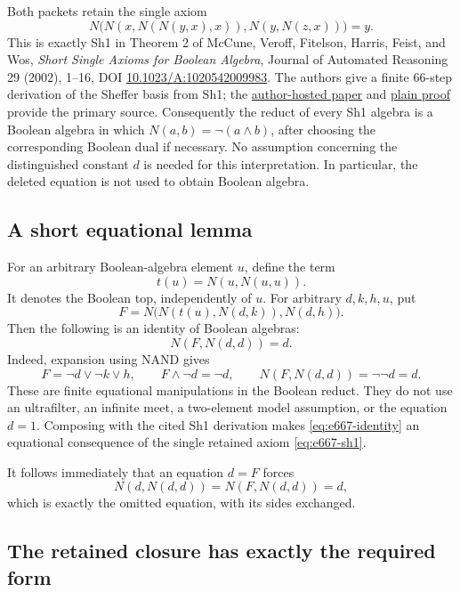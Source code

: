 Both packets retain the single axiom
\begin{equation}
 N\bigl(N(x,N(N(y,x),x)),N(y,N(z,x))\bigr)=y.
\label{eq:e667-sh1}
\end{equation}
This is exactly Sh1 in Theorem 2 of McCune, Veroff, Fitelson, Harris, Feist,
and Wos, \emph{Short Single Axioms for Boolean Algebra}, Journal of Automated
Reasoning 29 (2002), 1--16, DOI
\href{https://doi.org/10.1023/A:1020542009983}{10.1023/A:1020542009983}.
The authors give a finite 66-step derivation of the Sheffer basis from Sh1;
the \href{https://www.cs.unm.edu/~mccune/papers/basax/v12.pdf}{author-hosted
paper} and \href{https://www.cs.unm.edu/~mccune/papers/basax/Sh-1.proof}{plain
proof} provide the primary source.
Consequently the reduct of every Sh1 algebra is a Boolean algebra in which
\(N(a,b)=\neg(a\wedge b)\), after choosing the corresponding Boolean dual if
necessary.  No assumption concerning the distinguished constant \(d\) is
needed for this interpretation.  In particular, the deleted equation is
not used to obtain Boolean algebra.

\subsection{A short equational lemma}

For an arbitrary Boolean-algebra element \(u\), define the term
\[
                   t(u)=N(u,N(u,u)).
\]
It denotes the Boolean top, independently of \(u\).  For arbitrary
\(d,k,h,u\), put
\[
              F=N\bigl(N(t(u),N(d,k)),N(d,h)\bigr).
\]
Then the following is an identity of Boolean algebras:
\begin{equation}
                         N(F,N(d,d))=d.
\label{eq:e667-identity}
\end{equation}
Indeed, expansion using NAND gives
\[
 F=\neg d\vee\neg k\vee h,
 \qquad F\wedge\neg d=\neg d,
 \qquad N(F,N(d,d))=\neg\neg d=d.
\]
These are finite equational manipulations in the Boolean reduct.  They do
not use an ultrafilter, an infinite meet, a two-element model assumption,
or the equation \(d=1\).  Composing with the cited Sh1 derivation makes
\eqref{eq:e667-identity} an equational consequence of the single retained
axiom \eqref{eq:e667-sh1}.

It follows immediately that an equation \(d=F\) forces
\[
 N(d,N(d,d))=N(F,N(d,d))=d,
\]
which is exactly the omitted equation, with its sides exchanged.

\subsection{The retained closure has exactly the required form}

